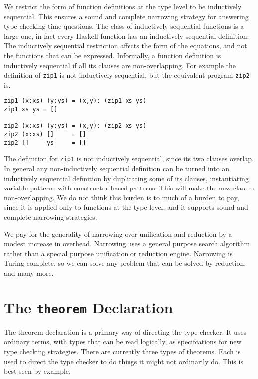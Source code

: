 \documentclass[11pt,twoside]{article}
\begin{document}
We restrict the form of function definitions at the type level to be inductively
sequential\cite{conf/alp/Antoy92}.
This ensures a sound and complete narrowing strategy for answering type-checking
time questions. The class of inductively sequential functions is a large
one, in fact every Haskell function has an inductively sequential definition. The
inductively sequential restriction affects the form of the equations, and not the
functions that can be expressed. Informally, a function definition is
inductively sequential if all its clauses are non-overlapping. For example
the definition of {\tt zip1} is not-inductively sequential, but the equivalent
program {\tt zip2} is.

{ %
\begin{verbatim}
zip1 (x:xs) (y:ys) = (x,y): (zip1 xs ys)
zip1 xs ys = []

zip2 (x:xs) (y:ys) = (x,y): (zip2 xs ys)
zip2 (x:xs) []     = []
zip2 []     ys     = []
\end{verbatim}}

The definition for {\tt zip1} is not inductively sequential, since its two clauses overlap. In general
any non-inductively sequential definition can be turned into an inductively
sequential definition by duplicating some of its clauses, instantiating variable patterns
with constructor based patterns. This will make the new clauses non-overlapping.
We do not think this burden is to much of a burden to pay, since
it is applied only to functions at the type level, and it supports
sound and complete narrowing strategies.

We pay for the generality of narrowing over unification and reduction
by a modest increase in overhead. Narrowing uses a general purpose
search algorithm rather than a special purpose unification or
reduction engine. Narrowing is Turing complete, so we
can solve any problem that can be solved by reduction, and many more.


\section{The {\tt theorem} Declaration} \label{theorem}
The theorem declaration is a primary way of directing the type
checker. It uses ordinary terms, with types that can be read logically,
as specifcations for new  type checking strategies.  There are currently
three types of theorems. Each is used to direct the type
checker to do things it might not ordinarily do. This is
best seen by example.
\end{document}
